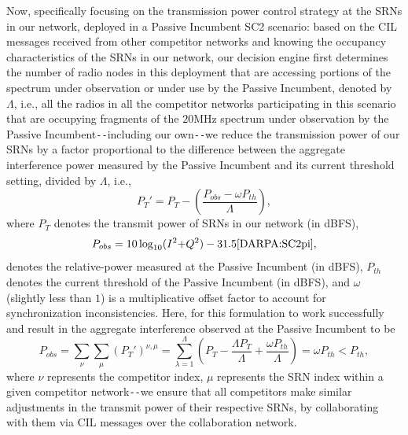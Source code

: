 Now, specifically focusing on the transmission power control strategy at the SRNs in our network, deployed in a Passive Incumbent SC2 scenario: based on the CIL messages received from other competitor networks and knowing the occupancy characteristics of the SRNs in our network, our decision engine first determines the number of radio nodes in this deployment that are accessing portions of the spectrum under observation or under use by the Passive Incumbent, denoted by $\Lambda$, i.e., all the radios in all the competitor networks participating in this scenario that are occupying fragments of the $20$MHz spectrum under observation by the Passive Incumbent\texttt{-{}-}including our own\texttt{-{}-}we reduce the transmission power of our SRNs by a factor proportional to the difference between the aggregate interference power measured by the Passive Incumbent and its current threshold setting, divided by $\Lambda$, i.e., 
\begin{equation}\label{B.1}
    P_{T}'=P_{T}-\left(\frac{P_{obs}-\omega P_{th}}{\Lambda}\right),
\end{equation}
where $P_{T}$ denotes the transmit power of SRNs in our network (in dBFS), 
\begin{equation}\label{B.2}
    P_{obs}=10\log_{10}(I^{2}{+}Q^{2})-31.5\text{\cite{DARPA:SC2pi},}
\end{equation}
denotes the relative-power measured at the Passive Incumbent (in dBFS), $P_{th}$ denotes the current threshold of the Passive Incumbent (in dBFS), and $\omega$ (slightly less than $1$) is a multiplicative offset factor to account for synchronization inconsistencies. Here, for this formulation to work successfully and result in the aggregate interference observed at the Passive Incumbent to be
\begin{equation}\label{B.3}
    P_{obs}=\sum_{\nu}\sum_{\mu}(P_{T}')^{\nu,\mu}=\sum_{\lambda=1}^{\Lambda}\left(P_{T}-\frac{\Lambda P_{T}}{\Lambda}+\frac{{\omega}P_{th}}{\Lambda}\right)={\omega}P_{th}<P_{th},    
\end{equation}
where $\nu$ represents the competitor index, $\mu$ represents the SRN index within a given competitor network\texttt{-{}-}we ensure that all competitors make similar adjustments in the transmit power of their respective SRNs, by collaborating with them via CIL messages over the collaboration network.

